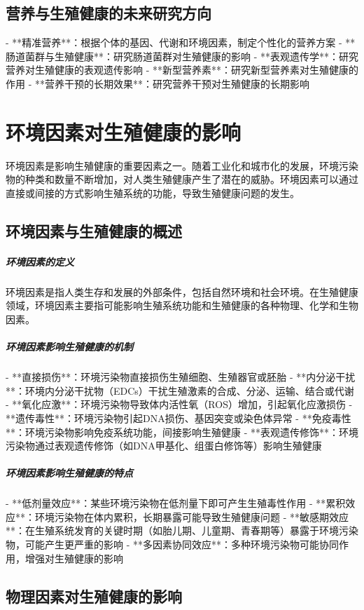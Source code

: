 \begin{enumerate}
\subsection{营养与生殖健康的未来研究方向}

- **精准营养**：根据个体的基因、代谢和环境因素，制定个性化的营养方案
- **肠道菌群与生殖健康**：研究肠道菌群对生殖健康的影响
- **表观遗传学**：研究营养对生殖健康的表观遗传影响
- **新型营养素**：研究新型营养素对生殖健康的作用
- **营养干预的长期效果**：研究营养干预对生殖健康的长期影响

\section{环境因素对生殖健康的影响}

环境因素是影响生殖健康的重要因素之一。随着工业化和城市化的发展，环境污染物的种类和数量不断增加，对人类生殖健康产生了潜在的威胁。环境因素可以通过直接或间接的方式影响生殖系统的功能，导致生殖健康问题的发生。

\subsection{环境因素与生殖健康的概述}

\subparagraph{环境因素的定义}
环境因素是指人类生存和发展的外部条件，包括自然环境和社会环境。在生殖健康领域，环境因素主要指可能影响生殖系统功能和生殖健康的各种物理、化学和生物因素。

\subparagraph{环境因素影响生殖健康的机制}

- **直接损伤**：环境污染物直接损伤生殖细胞、生殖器官或胚胎
- **内分泌干扰**：环境内分泌干扰物（EDCs）干扰生殖激素的合成、分泌、运输、结合或代谢
- **氧化应激**：环境污染物导致体内活性氧（ROS）增加，引起氧化应激损伤
- **遗传毒性**：环境污染物引起DNA损伤、基因突变或染色体异常
- **免疫毒性**：环境污染物影响免疫系统功能，间接影响生殖健康
- **表观遗传修饰**：环境污染物通过表观遗传修饰（如DNA甲基化、组蛋白修饰等）影响生殖健康

\subparagraph{环境因素影响生殖健康的特点}

- **低剂量效应**：某些环境污染物在低剂量下即可产生生殖毒性作用
- **累积效应**：环境污染物在体内累积，长期暴露可能导致生殖健康问题
- **敏感期效应**：在生殖系统发育的关键时期（如胎儿期、儿童期、青春期等）暴露于环境污染物，可能产生更严重的影响
- **多因素协同效应**：多种环境污染物可能协同作用，增强对生殖健康的影响

\subsection{物理因素对生殖健康的影响}


\end{enumerate}
